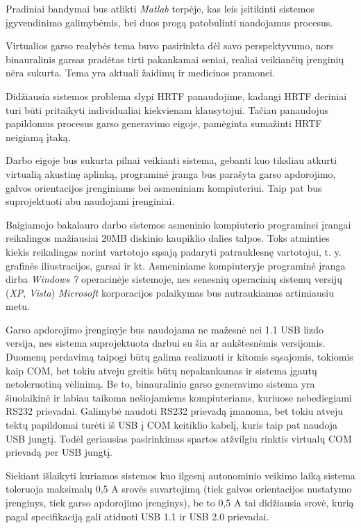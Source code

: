 \documentclass[]{vgtuef}
\begin{document}
Pradiniai bandymai bus atlikti \textit{Matlab} terpėje, kas leis įsitikinti sistemos įgyvendinimo galimybėmis, bei duos progą patobulinti naudojamus procesus.

Virtualios garso realybės tema buvo pasirinkta dėl savo perspektyvumo, nors binauralinis garsas pradėtas tirti pakankamai seniai, realiai veikiančių įrenginių nėra sukurta. Tema yra aktuali žaidimų ir medicinos pramonei.

Didžiausia sistemos problema slypi HRTF panaudojime, kadangi HRTF deriniai turi būti pritaikyti individualiai kiekvienam klausytojui. Tačiau panaudojus papildomus procesus garso generavimo eigoje, pamėginta sumažinti HRTF neigiamą įtaką.

Darbo eigoje bus sukurta pilnai veikianti sistema, gebanti kuo tiksliau atkurti virtualią akustinę aplinką, programinė įranga bus parašyta garso apdorojimo, galvos orientacijos įrenginiams bei asmeniniam kompiuteriui. Taip pat bus suprojektuoti abu naudojami įrenginiai.

Baigiamojo bakalauro darbo sistemos asmeninio kompiuterio programinei įrangai reikalingos mažiausiai 20MB diskinio kaupiklio dalies talpos. Toks atminties kiekis 
reikalingas norint vartotojo sąsają padaryti patrauklesnę vartotojui, t. y. grafinės iliustracijos, garsai ir kt. Asmeniniame kompiuteryje programinė įranga dirba 
\textit{Windows 7} operacinėje sistemoje, nes senesnių operacinių sistemų versijų (\textit{XP}, \textit{Vista}) \textit{Microsoft} korporacijos palaikymas bus 
nutraukiamas artimiausiu metu.

Garso apdorojimo įrenginyje bus naudojama ne mažesnė nei 1.1 USB lizdo versija, nes sistema suprojektuota darbui su šia ar aukštesnėmis versijomis. Duomenų perdavimą taipogi būtų galima realizuoti ir kitomis sąsajomis, tokiomis kaip COM, bet tokiu atveju greitis būtų nepakankamas ir sistema įgautų netoleruotiną vėlinimą. Be to, binauralinio garso generavimo sistema yra šiuolaikinė ir labiau taikoma nešiojamiems kompiuteriams, kuriuose nebediegiami RS232 prievadai. Galimybė naudoti RS232 prievadą įmanoma, bet tokiu atveju tektų papildomai turėti iš USB į COM keitiklio kabelį, kuris taip pat naudoja USB jungtį. Todėl geriausias pasirinkimas spartos atžvilgiu rinktis virtualų COM prievadą per USB jungtį.

Siekiant išlaikyti kuriamos sistemos kuo ilgesnį autonominio veikimo laiką sistema toleruoja maksimalų 0,5 A srovės suvartojimą (tiek galvos orientacijos nustatymo įrenginys, tiek garso apdorojimo įrenginys), be to 0,5 A tai didžiausia srovė, kurią pagal specifikaciją gali atiduoti USB 1.1 ir USB 2.0 prievadai.
\end{document}

